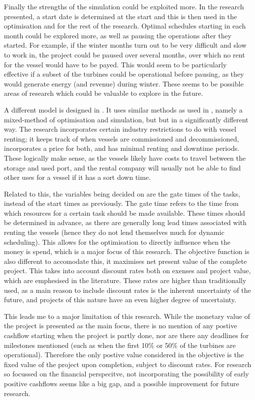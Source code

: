 \documentclass[a4paper,12pt]{article}
\begin{document}
Finally the strengths of the simulation could be exploited more. In the research presented, a start date is determined at the start and this is then used in the optimisation and for the rest of the research. Optimal schedules starting in each month could be explored more, as well as pausing the operations after they started. For example, if the winter months turn out to be very difficult and slow to work in, the project could be paused over several months, over which no rent for the vessel would have to be payed. This would seem to be particularly effective if a subset of the turbines could be operational before pausing, as they would generate energy (and revenue) during winter. These seems to be possible areas of research which could be valuable to explore in the future.  

\bigskip

A different model is designed in \cite{kerkhove2017optimised}. It uses similar methods as used in \cite{barlow2018mixed}, namely a mixed-method of optimisation and simulation, but but in a significantly different way. The research incorporates certain industry restrictions to do with vessel renting; it keeps track of when vessels are commissioned and decommissioned, incorporates a price for both, and has minimal renting and downtime periods. These logically make sense, as the vessels likely have costs to travel between the storage and used port, and the rental company will usually not be able to find other uses for a vessel if it has a sort down time. 

Related to this, the variables being decided on are the gate times of the tasks, instead of the start times as previously. The gate time refers to the time from which resources for a certain task should be made available. These times should be determined in advance, as there are generally long lead times associated with renting the vessels (hence they do not lend themselves much for dynamic scheduling). This allows for the optimisation to directly influence when the money is spend, which is a major focus of this research. The objective function is also different to accomodate this, it maximises net present value of the complete project. This takes into account discount rates both on exenses and project value, which are emphesised in the literature. These rates are higher than traditionally used, as a main reason to include discount rates is the inherent uncertainty of the future, and projects of this nature have an even higher degree of uncertainty.

This leads me to a major limitation of this research. While the monetary value of the project is presented as the main focus, there is no mention of any postive cashflow starting when the project is partly done, nor are there any deadlines for milestones mentioned (such as when the first 10\% or 50\% of the turbines are operational). Therefore the only postive value considered in the objective is the fixed value of the project upon completion, subject to discount rates. For research so focussed on the financial perspecitve, not incorporating the possibility of early positive cashflows seems like a big gap, and a possible improvement for future research.
\end{document}
